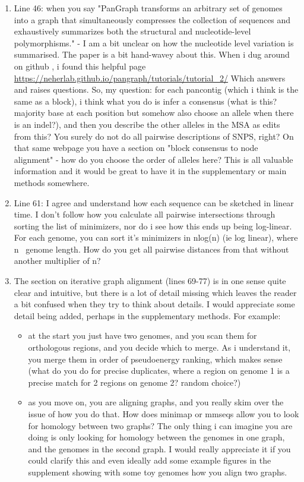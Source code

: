 \documentclass{article}
\begin{document}
\begin{enumerate}
    \item Line 46: when you say "PanGraph transforms an arbitrary set of genomes into a graph that simultaneously compresses the collection of sequences and exhaustively summarizes both the structural and nucleotide-level polymorphisms." - I am a bit unclear on how the nucleotide level variation is summarised. The paper is a bit hand-wavey about this. When i dug around on github , i found this helpful page \url{https://neherlab.github.io/pangraph/tutorials/tutorial_2/} Which answers and raises questions. So, my question: for each pancontig (which i think is the same as a block), i think what you do is infer a consensus (what is this? majority base at each position but somehow also choose an allele when there is an indel?), and then you describe the other alleles in the MSA as edits from this? You surely do not do all pairwise descriptions of SNPS, right? On that same webpage you have a section on "block consensus to node alignment" - how do you choose the order of alleles here? This is all valuable information and it would be great to have it in the supplementary or main methods somewhere.

    \item Line 61: I agree and understand how each sequence can be sketched in linear time. I don't follow how you calculate all pairwise intersections through sorting the list of minimizers, nor do i see how this ends up being log-linear. For each genome, you can sort it's minimizers in nlog(n) (ie log linear), where n ~genome length. How do you get all pairwise distances from that without another multiplier of n?

    \item The section on iterative graph alignment (lines 69-77) is in one sense quite clear and intuitive, but there is a lot of detail missing which leaves the reader a bit confused when they try to think about details. I would appreciate some detail being added, perhaps in the supplementary methods. For example:
          \begin{itemize}
              \item at the start you just have two genomes, and you scan them for orthologous regions, and you decide which to merge. As i understand it, you merge them in order of pseudoenergy ranking, which makes sense (what do you do for precise duplicates, where a region on genome 1 is a precise match for 2 regions on genome 2? random choice?)
              \item as you move on, you are aligning graphs, and you really skim over the issue of how you do that. How does minimap or mmseqs allow you to look for homology between two graphs? The only thing i can imagine you are doing is only looking for homology between the genomes in one graph, and the genomes in the second graph. I would really appreciate it if you could clarify this and even ideally add some example figures in the supplement showing with some toy genomes how you align two graphs.
          \end{itemize}


\end{enumerate}
\end{document}

